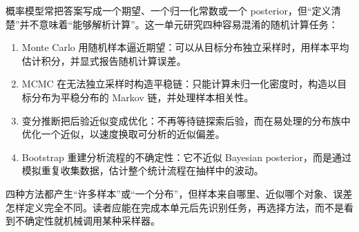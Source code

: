 概率模型常把答案写成一个期望、一个归一化常数或一个 posterior，但``定义清楚''并不意味着``能够解析计算''。这一单元研究四种容易混淆的随机计算任务：

\begin{enumerate}
\def\labelenumi{\arabic{enumi}.}
\tightlist
\item
  Monte Carlo 用随机样本逼近期望：可以从目标分布独立采样时，用样本平均估计积分，并显式报告随机计算误差。
\item
  MCMC 在无法独立采样时构造平稳链：只能计算未归一化密度时，构造以目标分布为平稳分布的 Markov 链，并处理样本相关性。
\item
  变分推断把后验近似变成优化：不再等待链探索后验，而在易处理的分布族中优化一个近似，以速度换取可分析的近似偏差。
\item
  Bootstrap 重建分析流程的不确定性：它不近似 Bayesian posterior，而是通过模拟重复收集数据，估计整个统计流程在抽样中的波动。
\end{enumerate}

四种方法都产生``许多样本''或``一个分布''，但样本来自哪里、近似哪个对象、误差怎样定义完全不同。读者应能在完成本单元后先识别任务，再选择方法，而不是看到不确定性就机械调用某种采样器。
